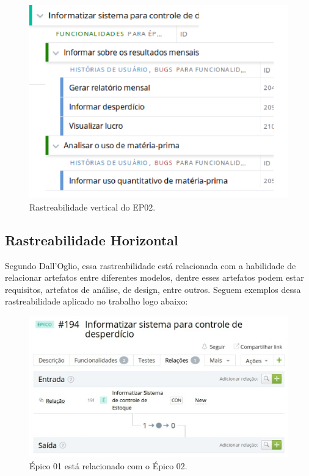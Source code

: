 \begin{figure}[!htpb]
\centering
\includegraphics[scale=0.35]{figuras/processo/epico2}
\caption{Rastreabilidade vertical do EP02.}
\end{figure}

\subsection{Rastreabilidade Horizontal}
Segundo Dall'Oglio, essa rastreabilidade está relacionada com a habilidade de relacionar artefatos entre diferentes modelos, dentre esses artefatos podem estar requisitos, artefatos de análise, de design, entre outros. Seguem exemplos dessa rastreabilidade aplicado no trabalho logo abaixo:

\begin{figure}[!htpb]
\centering
\includegraphics[scale=0.45]{figuras/gerenciamento/epic}
\caption{Épico 01 está relacionado com o Épico 02.}
\end{figure}

